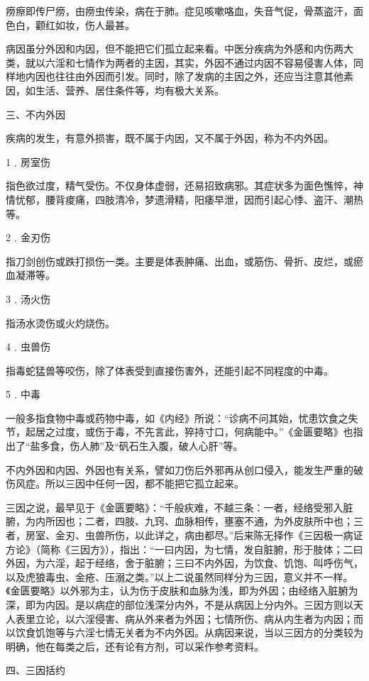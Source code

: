 \documentclass[12pt,UTF8]{ctexbook}
\begin{document}
痨瘵即传尸痨，由痨虫传染，病在于肺。症见咳嗽咯血，失音气促，骨蒸盗汗，面色白，颧红如妆，伤人最甚。

病因虽分外因和内因，但不能把它们孤立起来看。中医分疾病为外感和内伤两大类，就以六淫和七情作为两者的主因，其实，外因不通过内因不容易侵害人体，同样地内因也往往由外因而引发。同时，除了发病的主因之外，还应当注意其他素因，如生活、营养、居住条件等，均有极大关系。

三、不内外因

疾病的发生，有意外损害，既不属于内因，又不属于外因，称为不内外因。

1﹒房室伤

指色欲过度，精气受伤。不仅身体虚弱，还易招致病邪。其症状多为面色憔悴，神情忧郁，腰背痠痛，四肢清冷，梦遗滑精，阳痿早泄，因而引起心悸、盗汗、潮热等。

2﹒金刃伤

指刀剑创伤或跌打损伤一类。主要是体表肿痛、出血，或筋伤、骨折、皮烂，或瘀血凝滞等。

3﹒汤火伤

指汤水烫伤或火灼烧伤。

4﹒虫兽伤

指毒蛇猛兽等咬伤，除了体表受到直接伤害外，还能引起不同程度的中毒。

5﹒中毒

一般多指食物中毒或药物中毒，如《内经》所说：“诊病不问其始，忧患饮食之失节，起居之过度，或伤于毒，不先言此，猝持寸口，何病能中。”《金匮要略》也指出了“盐多食，伤人肺”及“矾石生入腹，破人心肝”等。

不内外因和内因、外因也有关系，譬如刀伤后外邪再从创口侵入，能发生严重的破伤风症。所以三因中任何一因，都不能把它孤立起来。

三因之说，最早见于《金匮要略》：“千般疢难，不越三条：一者，经络受邪入脏腑，为内所因也；二者，四肢、九窍、血脉相传，壅塞不通，为外皮肤所中也；三者，房室、金刃、虫兽所伤，以此详之，病由都尽。”后来陈无择作《三因极一病证方论》（简称《三因方》），指出：“一曰内因，为七情，发自脏腑，形于肢体；二曰外因，为六淫，起于经络，舍于脏腑；三曰不内外因，为饮食、饥饱、叫呼伤气，以及虎狼毒虫、金疮、压溺之类。”以上二说虽然同样分为三因，意义并不一样。《金匮要略》以外邪为主，认为伤于皮肤和血脉为浅，即为外因；由经络入脏腑为深，即为内因。是以病症的部位浅深分内外，不是从病因上分内外。三因方则以天人表里立论，以六淫侵害、病从外来者为外因；七情所伤、病从内生者为内因；而以饮食饥饱等与六淫七情无关者为不内外因。从病因来说，当以三因方的分类较为明确，他在每类之后，还有论有方剂，可以采作参考资料。

四、三因括约
\end{document}
